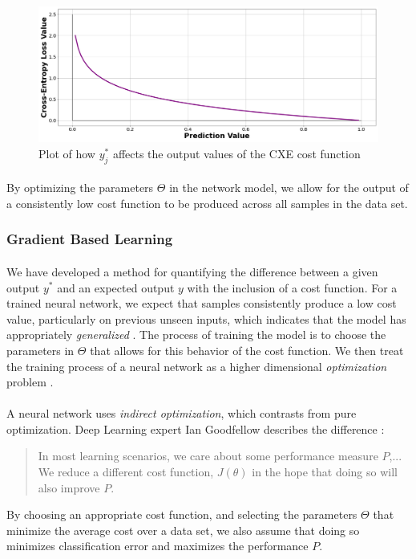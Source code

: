 \documentclass[12pt,letterpaper]{article}
\begin{document}
\begin{figure}[h]
\begin{center}
\includegraphics[scale=0.25]{../Figures/CXELoss}
\end{center}
\caption{Plot of how $y^*_{j}$ affects the output values of the CXE cost function}
\label{fig-CXELoss}
\end{figure}

\paragraph*{}By optimizing the parameters $\Theta$ in the network model, we allow for the output of a consistently low cost function to be produced across all samples in the data set.


\subsubsection{Gradient Based Learning}

\paragraph*{}We have developed a method for quantifying the difference between a given output $y^*$ and an expected output $y$ with the inclusion of a cost function. For a trained neural network, we expect that samples consistently produce a low cost value, particularly on previous unseen inputs, which indicates that the model has appropriately \textit{generalized} \cite{James,Loy}. The process of training the model is to choose the parameters in $\Theta$ that allows for this behavior of the cost function. We then treat the training process of a neural network as a higher dimensional \textit{optimization} problem \cite{Goodfellow}.

\paragraph*{}A neural network uses \textit{indirect optimization}, which contrasts from pure optimization. Deep Learning expert Ian Goodfellow describes the difference \cite{Goodfellow}:
\begin{quote}
In most learning scenarios, we care about some performance measure $P$,... We reduce a different cost function, $J(\theta)$ in the hope that doing so will also improve $P$.
\end{quote}
By choosing an appropriate cost function, and selecting the parameters $\Theta$ that minimize the average cost over a data set, we also assume that doing so minimizes classification error and maximizes the performance $P$.
\end{document}
